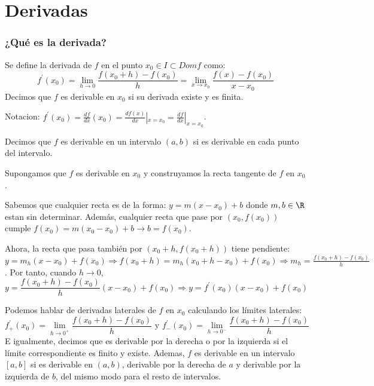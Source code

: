 \part{Derivadas}
\section{¿Qué es la derivada?}
\begin{definition}[Derivada]
	Se define la derivada de \(f \) en el punto \(x_0 \in I \subset Domf \) como:
	\[
		f^\prime (x_0) = \lim\limits_{h  \to 0 } \frac{f(x_0 + h ) - f(x_0)}{h} = \lim\limits_{x  \to x_0 } \frac{f(x) - f(x_0)}{x - x_0}
	\]
	Decimos que \(f \) es derivable en \(x_0 \) si su derivada existe y es finita.
\end{definition}
Notacion: \(f^\prime (x_0) = \frac{df}{dx} (x_0) = \frac{df(x)}{dx}|_{x = x_0} = \frac{df}{dx}|_{x = x_0}\).

\begin{definition}
	Decimos que \(f \) es derivable en un intervalo \((a,b )\) si es derivable en cada punto del intervalo.
\end{definition}

Supongamos que \(f \) es derivable en \(x_0 \) y construyamos la recta tangente de \(f \) en \(x_0 \).

Sabemos que cualquier recta es de la forma: \(y = m(x-x_0) + b \) donde \(m,b \in \R \) estan sin determinar. Además, cualquier recta que pase por \((x_0, f(x_0 ))\) cumple \(f(x_0) = m(x_0 - x_0) + b \rightarrow b = f(x_0 )\).

Ahora, la recta que pasa también por \((x_0 + h, f(x_0 + h ))\) tiene pendiente: \(y = m_h(x - x_0) + f(x_0 )\Rightarrow f(x_0 + h) = m_h (x_0 + h - x_0) + f(x_0) \Rightarrow m_h = \frac{f(x_0 + h) - f(x_0)}{h}\). Por tanto, cuando \(h \to 0\),
\[
	y = \frac{f(x_0 + h) - f(x_0)}{h} (x - x_0) + f(x_0) \Rightarrow \boxed{y = f^\prime (x_0) (x - x_0) + f(x_0)}
\]

\begin{definition}
	Podemos hablar de derivadas laterales de \(f \) en \(x_0 \) calculando los límites laterales:
	\[
		f^\prime_+(x_0) = \lim\limits_{h  \to 0^{+ } } \frac{f(x_0 + h) - f(x_0)}{h } \text{ y } f^\prime_-(x_0) = \lim\limits_{h  \to 0^{- } } \frac{f(x_0 + h) - f(x_0)}{h }
	\]
	E igualmente, decimos que es derivable por la derecha o por la izquierda si el límite correspondiente es finito y existe. Ademas, \(f \) es derivable en un intervalo \([a,b ]\) si es derivable en \((a,b )\), derivable por la derecha de \(a \) y derivable por la izquierda de \(b \), del mismo modo para el resto de intervalos.
\end{definition}

